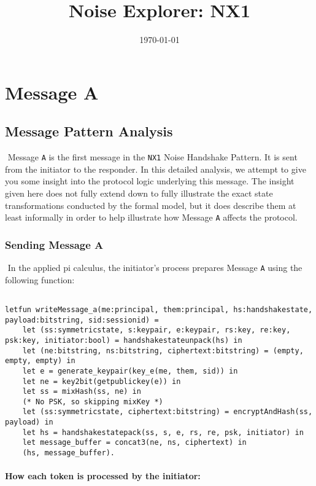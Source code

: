 \title{Noise Explorer: NX1}\date{\today}\maketitle\section{ Message A}

\subsection{Message Pattern Analysis}$ $
Message \texttt{A} is the first message in the \texttt{NX1} Noise Handshake Pattern. It is sent from the initiator to the responder. In this detailed analysis, we attempt to give you some insight into the protocol logic underlying this message. The insight given here does not fully extend down to fully illustrate the exact state transformations conducted by the formal model, but it does describe them at least informally in order to help illustrate how Message \texttt{A} affects the protocol.


\subsubsection{Sending Message A}$ $
In the applied pi calculus, the initiator's process prepares Message \texttt{A} using the following function:


\begin{lstlisting}

letfun writeMessage_a(me:principal, them:principal, hs:handshakestate, payload:bitstring, sid:sessionid) =
	let (ss:symmetricstate, s:keypair, e:keypair, rs:key, re:key, psk:key, initiator:bool) = handshakestateunpack(hs) in
	let (ne:bitstring, ns:bitstring, ciphertext:bitstring) = (empty, empty, empty) in
	let e = generate_keypair(key_e(me, them, sid)) in
	let ne = key2bit(getpublickey(e)) in
	let ss = mixHash(ss, ne) in
	(* No PSK, so skipping mixKey *)
	let (ss:symmetricstate, ciphertext:bitstring) = encryptAndHash(ss, payload) in
	let hs = handshakestatepack(ss, s, e, rs, re, psk, initiator) in
	let message_buffer = concat3(ne, ns, ciphertext) in
	(hs, message_buffer).

\end{lstlisting}

\paragraph{How each token is processed by the initiator:}$ $

